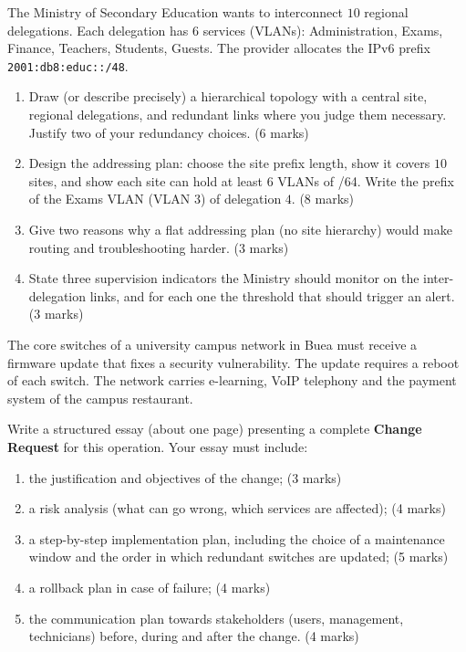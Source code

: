 \documentclass[11pt]{article}
\begin{document}
\begin{exercice}
The Ministry of Secondary Education wants to interconnect $10$ regional delegations. Each delegation has $6$ services (VLANs): Administration, Exams, Finance, Teachers, Students, Guests. The provider allocates the IPv6 prefix \texttt{2001:db8:educ::/48}.
\begin{enumerate}
\item Draw (or describe precisely) a hierarchical topology with a central site, regional delegations, and redundant links where you judge them necessary. Justify two of your redundancy choices. \hfill (6 marks)
\item Design the addressing plan: choose the site prefix length, show it covers $10$ sites, and show each site can hold at least $6$ VLANs of /64. Write the prefix of the Exams VLAN (VLAN $3$) of delegation $4$. \hfill (8 marks)
\item Give two reasons why a flat addressing plan (no site hierarchy) would make routing and troubleshooting harder. \hfill (3 marks)
\item State three supervision indicators the Ministry should monitor on the inter-delegation links, and for each one the threshold that should trigger an alert. \hfill (3 marks)
\end{enumerate}
\end{exercice}

\begin{exercice}
The core switches of a university campus network in Buea must receive a firmware update that fixes a security vulnerability. The update requires a reboot of each switch. The network carries e-learning, VoIP telephony and the payment system of the campus restaurant.

Write a structured essay (about one page) presenting a complete \textbf{Change Request} for this operation. Your essay must include:
\begin{enumerate}
\item the justification and objectives of the change; \hfill (3 marks)
\item a risk analysis (what can go wrong, which services are affected); \hfill (4 marks)
\item a step-by-step implementation plan, including the choice of a maintenance window and the order in which redundant switches are updated; \hfill (5 marks)
\item a rollback plan in case of failure; \hfill (4 marks)
\item the communication plan towards stakeholders (users, management, technicians) before, during and after the change. \hfill (4 marks)
\end{enumerate}
\end{exercice}
\end{document}
